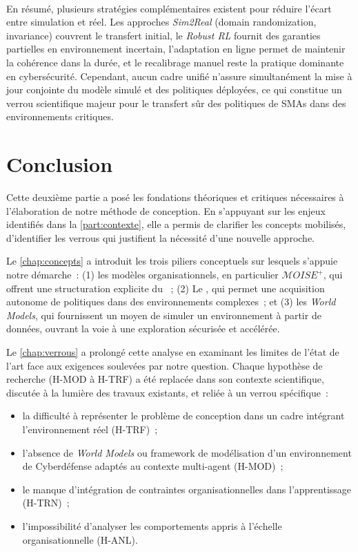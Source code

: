 \

\noindent
En résumé, plusieurs stratégies complémentaires existent
pour réduire l’écart entre simulation et réel.
Les approches \textit{Sim2Real} (domain randomization, invariance)
couvrent le transfert initial,
le \textit{Robust RL} fournit des garanties partielles en environnement incertain,
l’adaptation en ligne permet de maintenir la cohérence dans la durée,
et le recalibrage manuel reste la pratique dominante en cybersécurité.
Cependant, aucun cadre unifié n’assure simultanément
la mise à jour conjointe du modèle simulé et des politiques déployées,
ce qui constitue un verrou scientifique majeur pour le transfert sûr
des politiques de \acp{SMA} dans des environnements critiques.



\chapter*{Conclusion}

\noindent
Cette deuxième partie a posé les fondations théoriques et critiques nécessaires à l'élaboration de notre méthode de conception. En s'appuyant sur les enjeux identifiés dans la \autoref{part:contexte}, elle a permis de clarifier les concepts mobilisés, d'identifier les verrous qui justifient la nécessité d'une nouvelle approche.

\medskip

\noindent
Le \autoref{chap:concepts} a introduit les trois piliers conceptuels sur lesquels s'appuie notre démarche~: (1) les modèles organisationnels, en particulier \textit{$\mathcal{M}OISE^+$}, qui offrent une structuration explicite du ~; (2) Le , qui permet une acquisition autonome de politiques dans des environnements complexes~; et (3) les \textit{World Models}, qui fournissent un moyen de simuler un environnement à partir de données, ouvrant la voie à une exploration sécurisée et accélérée.

\noindent
Le \autoref{chap:verrous} a prolongé cette analyse en examinant les limites de l'état de l'art face aux exigences soulevées par notre question. Chaque hypothèse de recherche (H-MOD à H-TRF) a été replacée dans son contexte scientifique, discutée à la lumière des travaux existants, et reliée à un verrou spécifique~:
\begin{itemize}
  \item la difficulté à représenter le problème de conception dans un cadre intégrant l'environnement réel (H-TRF)~;
  \item l'absence de \textit{World Models} ou framework de modélisation d'un environnement de Cyberdéfense adaptés au contexte multi-agent (H-MOD)~;
  \item le manque d'intégration de contraintes organisationnelles dans l'apprentissage (H-TRN)~;
  \item l'impossibilité d'analyser les comportements appris à l'échelle organisationnelle (H-ANL).
\end{itemize}

